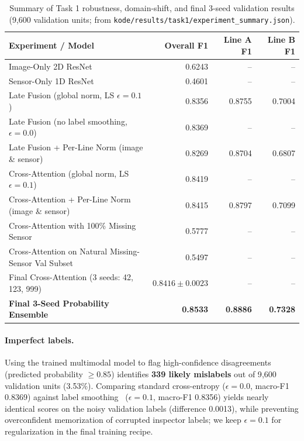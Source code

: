 \begin{table}[t]
  \centering
  \caption{Summary of Task 1 robustness, domain-shift, and final 3-seed validation results
  (9{,}600 validation units; from \texttt{kode/results/task1/experiment\_summary.json}).}
  \label{tab:t1-results}
  \small
  \begin{tabular}{lrrr}
    \toprule
    Experiment / Model & Overall F1 & Line A F1 & Line B F1 \\
    \midrule
    Image-Only 2D ResNet                                      & 0.6243 & --     & --     \\
    Sensor-Only 1D ResNet                                     & 0.4601 & --     & --     \\
    Late Fusion (global norm, LS $\epsilon=0.1$)              & 0.8356 & 0.8755 & 0.7004 \\
    Late Fusion (no label smoothing, $\epsilon=0.0$)          & 0.8369 & --     & --     \\
    Late Fusion + Per-Line Norm (image \& sensor)             & 0.8269 & 0.8704 & 0.6807 \\
    Cross-Attention (global norm, LS $\epsilon=0.1$)          & 0.8419 & --     & --     \\
    Cross-Attention + Per-Line Norm (image \& sensor)         & 0.8415 & 0.8797 & 0.7099 \\
    Cross-Attention with 100\% Missing Sensor                 & 0.5777 & --     & --     \\
    Cross-Attention on Natural Missing-Sensor Val Subset      & 0.5497 & --     & --     \\
    \midrule
    Final Cross-Attention (3 seeds: 42, 123, 999)             & $0.8416 \pm 0.0023$ & -- & -- \\
    \textbf{Final 3-Seed Probability Ensemble}                & \textbf{0.8533} & \textbf{0.8886} & \textbf{0.7328} \\
    \bottomrule
  \end{tabular}
\end{table}

\paragraph{Imperfect labels.} Using the trained multimodal model to flag high-confidence
disagreements (predicted probability $\ge 0.85$) identifies \textbf{339 likely mislabels} out of
9{,}600 validation units (3.53\%). Comparing standard cross-entropy ($\epsilon=0.0$, macro-F1
0.8369) against label smoothing~\cite{szegedy2016} ($\epsilon=0.1$, macro-F1 0.8356) yields nearly
identical scores on the noisy validation labels (difference 0.0013), while preventing overconfident
memorization of corrupted inspector labels; we keep $\epsilon=0.1$ for regularization in the final
training recipe.

